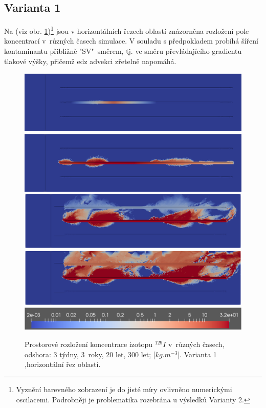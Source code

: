 \documentclass[11pt,a4paper]{article}
\newcommand{\obraz}[1]{(viz obr. \ref{#1})}
\begin{document}
\begin{onehalfspacing}
\newpage
\subsection{Varianta 1}
Na \obraz{var1}\footnote{Vyznění barevného zobrazení je do jisté míry ovlivněno numerickými oscilacemi. Podrobněji je problematika rozebrána u výsledků Varianty 2.} jsou v horizontálních řezech oblastí znázorněna rozložení pole koncentrací v~různých časech simulace. V souladu s předpokladem probíhá šíření kontaminantu přibližně "SV"~směrem, tj. ve směru převládajícího gradientu tlakové výšky, přičemž edz advekci zřetelně napomáhá.

\begin{figure}[H]
\centering
\includegraphics[clip,trim=0 {1cm} 0 0, width=16cm]{graphics/obr_ralek/nek_zdroj/01_3w.png}
\includegraphics[clip,trim=0 {1cm} 0 0, width=16cm]{graphics/obr_ralek/nek_zdroj/04_3a.png}
\includegraphics[clip,trim=0 {1cm} 0 0, width=16cm]{graphics/obr_ralek/nek_zdroj/06_20a.png}
\includegraphics[clip,trim=0 {1cm} 0 0, width=16cm]{graphics/obr_ralek/nek_zdroj/08_300a.png}
\includegraphics[width=16 cm]{graphics/obr_ralek/nek_zdroj/skala_nek_zdroj.png}
\caption{Prostorové rozložení koncentrace izotopu $^{129}I$ v~různých časech, odshora: 3 týdny, 3~roky, 20 let, 300 let; [$kg.m^{-3}$]. Varianta 1 ,horizontální řez oblastí.}
\label{var1}
\end{figure}


\end{onehalfspacing}
\end{document}
